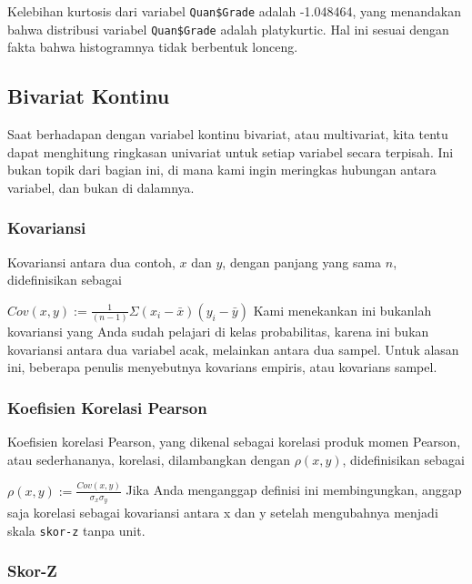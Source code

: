\documentclass[
]{book}
\begin{document}
Kelebihan kurtosis dari variabel \texttt{Quan\$Grade} adalah -1.048464, yang menandakan bahwa distribusi variabel \texttt{Quan\$Grade} adalah platykurtic. Hal ini sesuai dengan fakta bahwa histogramnya tidak berbentuk lonceng.

\hypertarget{bivariat-kontinu}{%
\subsection{Bivariat Kontinu}\label{bivariat-kontinu}}

Saat berhadapan dengan variabel kontinu bivariat, atau multivariat, kita tentu dapat menghitung ringkasan univariat untuk setiap variabel secara terpisah. Ini bukan topik dari bagian ini, di mana kami ingin meringkas hubungan antara variabel, dan bukan di dalamnya.

\hypertarget{kovariansi}{%
\subsubsection*{Kovariansi}\label{kovariansi}}

Kovariansi antara dua contoh, \(x\) dan \(y\), dengan panjang yang sama \(n\), didefinisikan sebagai

\(Cov(x,y):=\frac{1}{(n-1)}{\Sigma{(x_i-\bar{x})}{(y_i-\bar{y})}}\)
Kami menekankan ini bukanlah kovariansi yang Anda sudah pelajari di kelas probabilitas, karena ini bukan kovariansi antara dua variabel acak, melainkan antara dua sampel. Untuk alasan ini, beberapa penulis menyebutnya kovarians empiris, atau kovarians sampel.

\hypertarget{koefisien-korelasi-pearson}{%
\subsubsection*{Koefisien Korelasi Pearson}\label{koefisien-korelasi-pearson}}

Koefisien korelasi Pearson, yang dikenal sebagai korelasi produk momen Pearson, atau sederhananya, korelasi, dilambangkan dengan \(\rho(x,y)\), didefinisikan sebagai

\(\rho(x,y):=\frac{Cov(x,y)}{\sigma_x\sigma_y}\)
Jika Anda menganggap definisi ini membingungkan, anggap saja korelasi sebagai kovariansi antara x dan y setelah mengubahnya menjadi skala \texttt{skor-z} tanpa unit.

\hypertarget{skor-z}{%
\subsubsection*{Skor-Z}\label{skor-z}}
\end{document}
